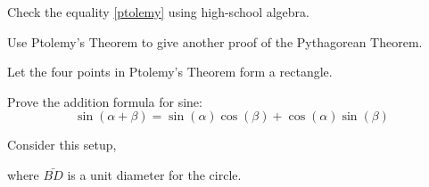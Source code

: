\documentclass[newpage,hints,handout]{ximera}
\begin{document}
\begin{problem}
Check the equality \eqref{ptolemy} using high-school algebra.
\begin{freeResponse}
\end{freeResponse}
\end{problem}

\begin{problem}
Use Ptolemy's Theorem to give another proof of the Pythagorean Theorem.
\begin{hint}
Let the four points in Ptolemy's Theorem form a rectangle.
\end{hint}
\begin{freeResponse}
\end{freeResponse}
\end{problem}


\begin{problem}
Prove the addition formula for sine:
\[
\sin(\alpha + \beta) = \sin(\alpha)\cos(\beta) +
\cos(\alpha)\sin(\beta)
\]
\begin{hint}
Consider this setup, 
\begin{image}
\end{image}
where $\bar{BD}$ is a unit diameter for the circle.
\end{hint}
\end{problem}
\end{document}
